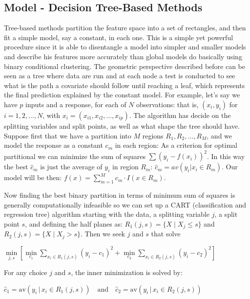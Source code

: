 \documentclass[
]{article}
\begin{document}
\hypertarget{model---decision-tree-based-methods}{%
\subsection{Model - Decision Tree-Based
Methods}\label{model---decision-tree-based-methods}}

Tree-based methods partition the feature space into a set of rectangles,
and then fit a simple model, say a constant, in each one. This is a
simple yet powerful procedure since it is able to disentangle a model
into simpler and smaller models and describe his features more
accurately than global models do basically using binary conditional
clustering. The geometric perspective described before can be seen as a
tree where data are run and at each node a test is conducted to see what
is the path a covariate should follow until reaching a leaf, which
represents the final prediction explained by the constant model. For
example, let's say we have \(p\) inputs and a response, for each of
\(N\) observations: that is, \((x_i,y_i)\) for \(i = 1,2,...,N\), with
\(x_i = (x_{i1},x_{i2},...,x_{ip})\). The algorithm has decide on the
splitting variables and split points, as well as what shape the tree
should have. Suppose first that we have a partition into \(M\) regions
\(R_1, R_2, ..., R_M\), and we model the response as a constant \(c_m\)
in each region: As a criterion for optimal partitional we can minimize
the sum of squares \(\sum(y_i-f(x_i))^2\). In this way the best
\(\hat{c}_m\) is just the average of \(y_i\) in region \(R_m\):
\(\hat{c}_m=av(y_i | x_i \in R_m)\). Our model will be then:
\(f(x)=\sum_{m=1}^{M} c_m \cdot I(x \in R_m)\).

Now finding the best binary partition in terms of minimum sum of squares
is generally computationally infeasible so we can set up a CART
(classification and regression tree) algorithm starting with the data, a
splitting variable \(j\), a split point \(s\), and defining the half
planes as: \(R_1(j,s) = \{X\mid X_j \leq s\}\) and
\(R_2(j,s) = \{X\mid X_j > s\}\). Then we seek \(j\) and \(s\) that
solve

\begin{center}
$\underset{j,s}{\min}\left[\underset{c_1}{\min}\sum_{x_i \in R_1(j,s)} (y_i-c_1)^2 + \underset{c_2}{\min} \sum_{x_i \in R_2(j,s)} (y_i-c_2)^2\right]$
\end{center}

For any choice \(j\) and \(s\), the inner minimization is solved by:

\begin{center}
$\hat{c}_1 = \text{av}(y_i \,|\, x_i \in R_1(j, s)) \quad \text{and} \quad \hat{c}_2 = \text{av}(y_i \,|\, x_i \in R_2(j, s))$
\end{center}
\end{document}
